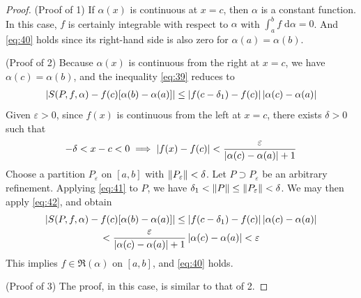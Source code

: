 \documentclass[thmcnt=section, 12pt]{my-elegantbook}
\begin{document}
\begin{proof}
    \par (Proof of 1) If $\alpha(x)$ is continuous at $x=c$, then $\alpha$ is a constant function. In this case, $f$ is certainly integrable with respect to $\alpha$ with $\int_{a}^{b} f \; \mathrm{d}\alpha = 0$. And \eqref{eq:40} holds since its right-hand side is also zero for $\alpha(a) = \alpha(b)$.

    \par (Proof of 2) Because $\alpha(x)$ is continuous from the right at $x=c$, we have $\alpha(c) = \alpha(b)$, and the inequality \eqref{eq:39} reduces to 
    \begin{align}
        \left\lvert 
            S(P,f,\alpha)
            - f(c) [\alpha(b) - \alpha(a)]
         \right\rvert
        \leq \left\lvert f(c-\delta_1) - f(c) \right\rvert \left\lvert \alpha(c) - \alpha(a) \right\rvert
        \label{eq:41}
    \end{align} 
    Given $\varepsilon > 0$, since $f(x)$ is continuous from the left at $x=c$, there exists $\delta > 0$ such that 
    \begin{align}
        -\delta < x - c < 0
        \implies \left\lvert f(x) - f(c) \right\rvert < \frac{\varepsilon}{\left\lvert \alpha(c) - \alpha(a) \right\rvert + 1}
        \label{eq:42}
    \end{align}
    Choose a partition $P_\varepsilon$ on $[a, b]$ with $\left\lVert P_\varepsilon \right\rVert < \delta$. Let $P \supset P_\varepsilon$ be an arbitrary refinement. Applying \eqref{eq:41} to $P$, we have $\delta_1 < \left\lVert P \right\rVert \leq \left\lVert P_\varepsilon \right\rVert<\delta$. We may then apply \eqref{eq:42}, and obtain
    \begin{multline*}
        \left\lvert 
            S(P,f,\alpha)
            - f(c) [\alpha(b) - \alpha(a)]
         \right\rvert
        \leq \left\lvert f(c-\delta_1) - f(c) \right\rvert \left\lvert \alpha(c) - \alpha(a) \right\rvert \\
        < \frac{\varepsilon}{\left\lvert \alpha(c) - \alpha(a) \right\rvert + 1} \left\lvert \alpha(c) - \alpha(a) \right\rvert
        < \varepsilon
    \end{multline*}
    This implies $f \in \mathfrak{R}(\alpha)$ on $[a, b]$, and \eqref{eq:40} holds.

    \par (Proof of 3) The proof, in this case, is similar to that of 2.


\end{proof}
\end{document}
